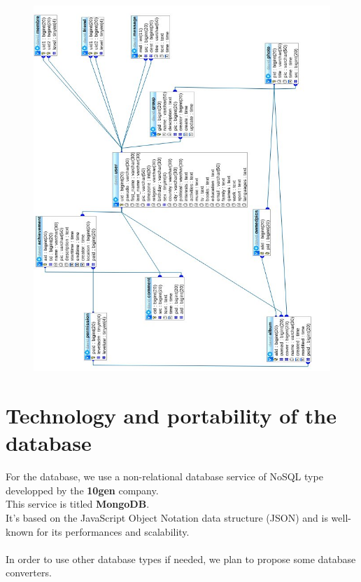 \documentclass {life-en}
\begin{document}
\begin{figure} [H]
  \begin{center}
    \includegraphics [width = 18cm]{img/imgdb.jpg}
  \end{center}
\end{figure}

\section{Technology and portability of the database}

For the database, we use a non-relational database service of NoSQL type developped by the \textbf{10gen} company.\\
This service is titled \textbf{MongoDB}.\\
It's based on the JavaScript Object Notation data structure (JSON) and is well-known for its performances and scalability.\\
\\
In order to use other database types if needed, we plan to propose some database converters.\\
\end{document}
